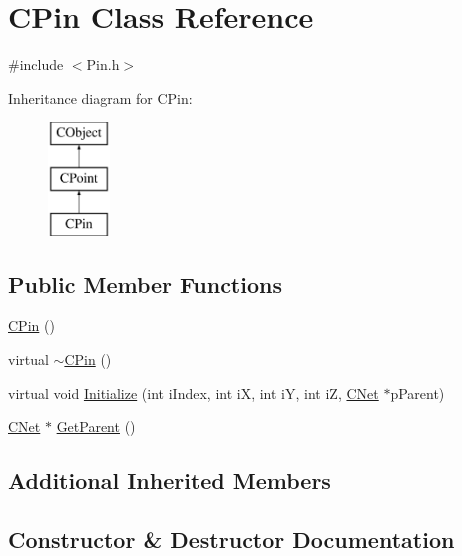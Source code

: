 \hypertarget{classCPin}{}\section{C\+Pin Class Reference}
\label{classCPin}


{\ttfamily \#include $<$Pin.\+h$>$}

Inheritance diagram for C\+Pin\+:\begin{figure}[H]
\begin{center}
\leavevmode
\includegraphics[height=3.000000cm]{classCPin}
\end{center}
\end{figure}
\subsection*{Public Member Functions}
\begin{DoxyCompactItemize}
\item 
\mbox{\hyperlink{classCPin_aedd93684e4ab47d5d097797955556645}{C\+Pin}} ()
\item 
virtual \mbox{\hyperlink{classCPin_adfd0f2db0a4d35e2fa64a57a72cfcf13}{$\sim$\+C\+Pin}} ()
\item 
virtual void \mbox{\hyperlink{classCPin_af52f7596a7edd0160763f881d0eb70c5}{Initialize}} (int i\+Index, int iX, int iY, int iZ, \mbox{\hyperlink{classCNet}{C\+Net}} $\ast$p\+Parent)
\item 
\mbox{\hyperlink{classCNet}{C\+Net}} $\ast$ \mbox{\hyperlink{classCPin_a973360bb15e72845cc423efb6baaeed2}{Get\+Parent}} ()
\end{DoxyCompactItemize}
\subsection*{Additional Inherited Members}


\subsection{Constructor \& Destructor Documentation}
\mbox{\label{classCPin_aedd93684e4ab47d5d097797955556645}} 
